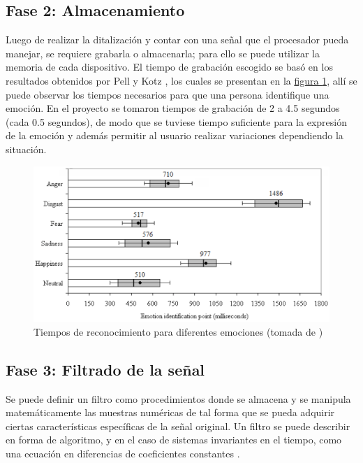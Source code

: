 \documentclass[11pt,lettersize]{article} %
\newcommand{\figura}[1]{\hyperref[{#1}]{figura \ref*{#1}}}
\begin{document}
\subsection{Fase 2: Almacenamiento}
Luego de realizar la ditalización y contar con una señal que el procesador pueda manejar, se requiere grabarla o almacenarla; para ello se puede utilizar la memoria de cada dispositivo. El tiempo de grabación escogido se basó en los resultados obtenidos por Pell y Kotz \cite{Pell2011}, los cuales se presentan en la \figura{F-time-emotion}, allí se puede observar los tiempos necesarios para que una persona identifique una emoción. En el proyecto se tomaron tiempos de grabación de 2 a 4.5 segundos (cada 0.5 segundos), de modo que se tuviese tiempo suficiente para la expresión de la emoción y además permitir al usuario realizar variaciones dependiendo la situación.
\begin{figure}[h!]
	\centering
	\includegraphics[width=.9\textwidth]{images/time-emotion.png}
	\caption[Tiempos de reconocimiento para diferentes emociones]{Tiempos de reconocimiento para diferentes emociones (tomada de \cite{Pell2011})}
	\label{F-time-emotion}
\end{figure}



\subsection{Fase 3: Filtrado de la señal}
Se puede definir un filtro como procedimientos donde se almacena y se manipula matemáticamente las muestras numéricas de tal forma que se pueda adquirir ciertas características específicas de la señal original. Un filtro se puede describir en forma de algoritmo, y en el caso de sistemas invariantes en el tiempo, como una ecuación en diferencias de coeficientes constantes \cite{Prandoni2008}.\\
\end{document}
